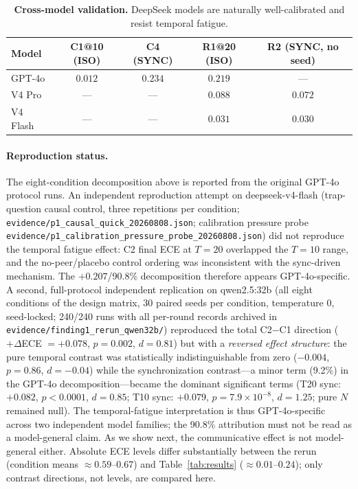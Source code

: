 \documentclass[11pt]{article}
\theoremstyle{definition}
\theoremstyle{remark}
\begin{document}
\begin{table}[H]
\centering
\caption{\textbf{Cross-model validation.} DeepSeek models are naturally well-calibrated and resist temporal fatigue.}
\label{tab:cross}
\begin{tabular}{@{}lcccc@{}}
\toprule
Model & C1@10 (ISO) & C4 (SYNC) & R1@20 (ISO) & R2 (SYNC, no seed) \\
\midrule
GPT-4o & $0.012$ & $0.234$ & $0.219$ & --- \\
V4 Pro & --- & --- & $0.088$ & $0.072$ \\
V4 Flash & --- & --- & $0.031$ & $0.030$ \\
\bottomrule
\end{tabular}
\end{table}

\paragraph{Reproduction status.} The eight-condition decomposition above is reported from the original GPT-4o protocol runs. An independent reproduction attempt on deepseek-v4-flash (trap-question causal control, three repetitions per condition; \texttt{evidence/p1\_causal\_quick\_20260808.json}; calibration pressure probe \texttt{evidence/p1\_calibration\_pressure\_probe\_20260808.json}) did not reproduce the temporal fatigue effect: C2 final ECE at $T{=}20$ overlapped the $T{=}10$ range, and the no-peer/placebo control ordering was inconsistent with the sync-driven mechanism. The $+0.207$/90.8\% decomposition therefore appears GPT-4o-specific. A second, full-protocol independent replication on qwen2.5:32b (all eight conditions of the design matrix, 30 paired seeds per condition, temperature 0, seed-locked; 240/240 runs with all per-round records archived in \texttt{evidence/finding1\_rerun\_qwen32b/}) reproduced the total C2$-$C1 direction ($+\Delta$ECE $= +0.078$, $p = 0.002$, $d = 0.81$) but with a \emph{reversed effect structure}: the pure temporal contrast was statistically indistinguishable from zero ($-0.004$, $p = 0.86$, $d = -0.04$) while the synchronization contrast---a minor term (9.2\%) in the GPT-4o decomposition---became the dominant significant terms (T20 sync: $+0.082$, $p < 0.0001$, $d = 0.85$; T10 sync: $+0.079$, $p = 7.9{\times}10^{-8}$, $d = 1.25$; pure $N$ remained null). The temporal-fatigue interpretation is thus GPT-4o-specific across two independent model families; the 90.8\% attribution must not be read as a model-general claim. As we show next, the communicative effect is not model-general either. Absolute ECE levels differ substantially between the rerun (condition means $\approx 0.59$--$0.67$) and Table~\ref{tab:results} ($\approx 0.01$--$0.24$); only contrast directions, not levels, are compared here.
\end{document}
